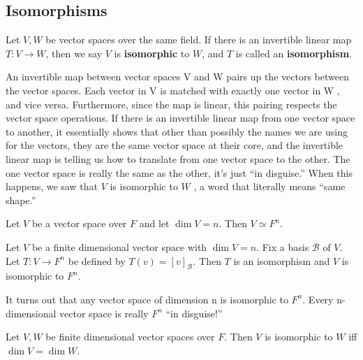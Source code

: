 \documentclass{article}
\begin{document}
\subsection{Isomorphisms}
\begin{definition}
  Let $V, W$ be vector spaces over the same field. If there is an invertible linear map $T: V \to W$, then we say $V$ is \textbf{isomorphic} to $W$, and $T$ is called an \textbf{isomorphism}.
\end{definition}
\begin{remark}
  An invertible map between vector spaces V and W pairs up the vectors
  between the vector spaces. Each vector in V is matched with exactly one
  vector in W , and vice versa.
  Furthermore, since the map is linear, this pairing respects the vector space
  operations.
  If there is an invertible linear map from one vector space to another, it
  essentially shows that other than possibly the names we are using for the
  vectors, they are the same vector space at their core, and the invertible
  linear map is telling us how to translate from one vector space to the
  other. The one vector space is really the same as the other, it’s just “in
  disguise.” When this happens, we saw that $V$ is isomorphic to $W$ , a word
  that literally means “same shape.”
\end{remark}
\begin{corollary}
  Let $V$ be a vector space over $F$ and let $\dim V = n$. Then $V \simeq F^n$.
\end{corollary}
\begin{theorem}
  Let $V$ be a finite dimensional vector space with $\dim V = n$. Fix a basis $\mathcal{B}$ of $V$. Let $T: V \to F^n$ be defined by $T(v) = [v]_\mathcal{B}$. Then $T$ is an isomorphism and $V$ is isomorphic to $F^n$.
\end{theorem}
\begin{remark}
  It turns out that any vector space of dimension n is isomorphic to $F^n$. Every n-dimensional vector space is really $F^n$ “in disguise!”
\end{remark}
\begin{theorem}
  Let $V, W$ be finite dimensional vector spaces over $F$. Then $V$ is isomorphic to $W$ iff $\dim V = \dim W$.
\end{theorem}
\end{document}
